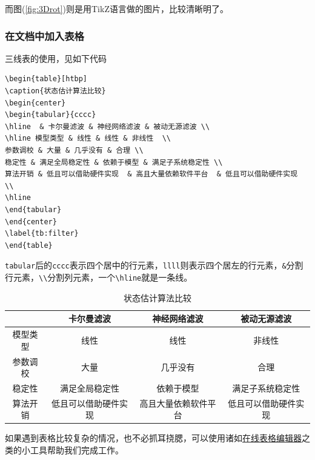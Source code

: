 而图(\ref{fig:3Drot})则是用TikZ语言做的图片，比较清晰明了。

\subsubsection{在文档中加入表格}
三线表的使用，见如下代码
\begin{lstlisting}
\begin{table}[htbp]
\caption{状态估计算法比较}
\begin{center}
\begin{tabular}{cccc}
\hline  & 卡尔曼滤波 & 神经网络滤波 & 被动无源滤波 \\ 
\hline 模型类型 & 线性 & 线性 & 非线性  \\ 
参数调校 & 大量 & 几乎没有 & 合理 \\ 
稳定性 & 满足全局稳定性 & 依赖于模型 & 满足子系统稳定性 \\ 
算法开销 & 低且可以借助硬件实现  & 高且大量依赖软件平台  & 低且可以借助硬件实现  \\ 
\hline
\end{tabular} 
\end{center}
\label{tb:filter}
\end{table}
\end{lstlisting}
\verb|tabular|后的\verb|cccc|表示四个居中的行元素，\verb|llll|则表示四个居左的行元素，\verb|&|分割行元素，\verb|\\|分割列元素，一个\verb|\hline|就是一条线。
\begin{table}[thbp]
	\caption{状态估计算法比较}
	\begin{center}
		\begin{tabular}{cccc}
			\hline          & 卡尔曼滤波           & 神经网络滤波         & 被动无源滤波         \\
			\hline 模型类型 & 线性                 & 线性                 & 非线性               \\
			参数调校        & 大量                 & 几乎没有             & 合理                 \\
			稳定性          & 满足全局稳定性       & 依赖于模型           & 满足子系统稳定性     \\
			算法开销        & 低且可以借助硬件实现 & 高且大量依赖软件平台 & 低且可以借助硬件实现 \\
			\hline
		\end{tabular}
	\end{center}
	\label{tb:filter}
\end{table}

如果遇到表格比较复杂的情况，也不必抓耳挠腮，可以使用诸如\href{http://www.tablesgenerator.com}{在线表格编辑器}之类的小工具帮助我们完成工作。

